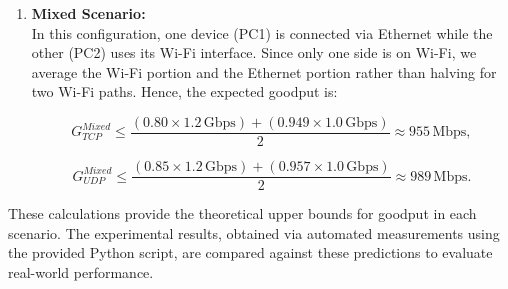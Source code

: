 \begin{enumerate}
            \vspace{0.1cm} %

            \item \textbf{Mixed Scenario:} \\
            In this configuration, one device (PC1) is connected via Ethernet while the other (PC2) uses its Wi-Fi interface. 
            Since only one side is on Wi-Fi, we average the Wi-Fi portion and the Ethernet portion rather than halving for two Wi-Fi paths. 
            Hence, the expected goodput is:

            \[
            G_{TCP}^{Mixed} \leq \frac{(0.80 \times 1.2\,\text{Gbps}) + (0.949 \times 1.0\,\text{Gbps})}{2} \approx 955\,\text{Mbps},
            \]

            \[
            G_{UDP}^{Mixed} \leq \frac{(0.85 \times 1.2\,\text{Gbps}) + (0.957 \times 1.0\,\text{Gbps})}{2} \approx 989\,\text{Mbps}.
            \]

        \end{enumerate}

        \vspace{0.1cm} %

        \noindent These calculations provide the theoretical upper bounds for goodput in each scenario. 
        The experimental results, obtained via automated measurements using the provided Python script, are compared against these predictions to evaluate real-world performance.

        \medskip
